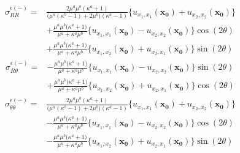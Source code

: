 \begin{align}
	\sigma_{RR}^{\epsilon(-)} =
	&\frac{2\mu^{a}\mu^{b}(\kappa^{a}+1)}{\bigl(\mu^{a}(\kappa^{b}-1)+2\mu^{b}\bigr)(\kappa^{a}-1)}
	\bigl\{u_{x_{1},x_{1}}(\bm{x_{0}})+u_{x_{2},x_{2}}(\bm{x_{0}})\bigr\}
	\nonumber
	\\
	&+\frac{\mu^{a}\mu^{b}\bigl(\kappa^{a}+1\bigr)}{\mu^{a}+\kappa^{a}\mu^{b}}
	\bigl\{u_{x_{1},x_{1}}(\bm{x_{0}})-u_{x_{2},x_{2}}(\bm{x_{0}})\bigr\}\cos(2\theta)
	\nonumber
	\\
	&+\frac{\mu^{a}\mu^{b}\bigl(\kappa^{a}+1\bigr)}{\mu^{a}+\kappa^{a}\mu^{b}}
	\bigl\{u_{x_{1},x_{2}}(\bm{x_{0}})+u_{x_{2},x_{1}}(\bm{x_{0}})\bigr\}\sin(2\theta)
	\label{eq:SigmaRRInEpsSol}
\end{align}
\begin{align}
	\sigma_{R\theta}^{\epsilon(-)} =
	&-\frac{\mu^{a}\mu^{b}\bigl(\kappa^{a}+1\bigr)}{\mu^{a}+\kappa^{a}\mu^{b}}
	\bigl\{u_{x_{1},x_{1}}(\bm{x_{0}})-u_{x_{2},x_{2}}(\bm{x_{0}})\bigr\}\sin(2\theta)
	\nonumber
	\\
	&+\frac{\mu^{a}\mu^{b}\bigl(\kappa^{a}+1\bigr)}{\mu^{a}+\kappa^{a}\mu^{b}}
	\bigl\{u_{x_{1},x_{2}}(\bm{x_{0}})+u_{x_{2},x_{1}}(\bm{x_{0}})\bigr\}\cos(2\theta)
	\label{eq:SigmaRThInEpsSol}
\end{align}
\begin{align}
	\sigma_{\theta\theta}^{\epsilon(-)} =
	&\frac{2\mu^{a}\mu^{b}(\kappa^{a}+1)}{\bigl(\mu^{a}(\kappa^{b}-1)+2\mu^{b}\bigr)(\kappa^{a}-1)}
	\bigl\{u_{x_{1},x_{1}}(\bm{x_{0}})+u_{x_{2},x_{2}}(\bm{x_{0}})\bigr\}
	\nonumber
	\\
	&-\frac{\mu^{a}\mu^{b}\bigl(\kappa^{a}+1\bigr)}{\mu^{a}+\kappa^{a}\mu^{b}}
	\bigl\{u_{x_{1},x_{1}}(\bm{x_{0}})-u_{x_{2},x_{2}}(\bm{x_{0}})\bigr\}\cos(2\theta)
	\nonumber
	\\
	&-\frac{\mu^{a}\mu^{b}\bigl(\kappa^{a}+1\bigr)}{\mu^{a}+\kappa^{a}\mu^{b}}
	\bigl\{u_{x_{1},x_{2}}(\bm{x_{0}})+u_{x_{2},x_{1}}(\bm{x_{0}})\bigr\}\sin(2\theta)
	\label{eq:SigmaThThInEpsSol}
\end{align}

